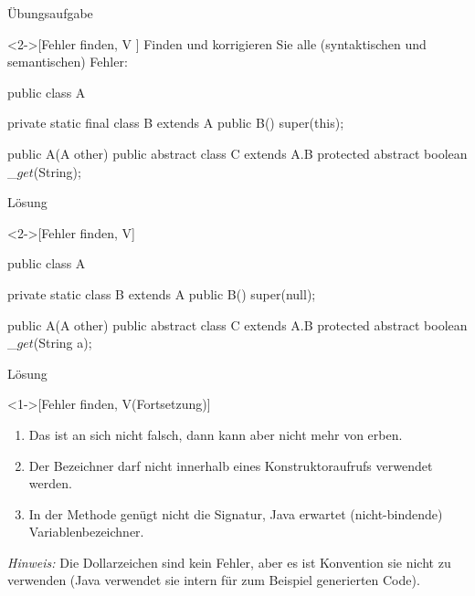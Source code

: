 \begin{frame}[c,fragile]{Übungsaufgabe}
    \begin{exercise}<2->[Fehler finden, V ]
        \pause{}Finden und korrigieren Sie alle (syntaktischen und semantischen) Fehler:\pause{}
{\footnotesize
        \begin{plainvoid}
public class A {
    private static final class B extends A {
        public B() {
            super(this);
        }
    }

    public A(A other){}
    public abstract class C extends A.B {
        protected abstract boolean _$get$(String);
    }
}
        \end{plainvoid}
}
    \end{exercise}
\end{frame}

\begin{frame}[c,fragile]{Lösung}
    \begin{solve}<2->[Fehler finden, V]
        \pause{}\footnotesize\begin{plainjava}[morekeywords={[3]{A,B,C}}]
public class A {
    private static class B extends A {
        public B() {
            super(null);
        }
    }

    public A(A other){}
    public abstract class C extends A.B {
        protected abstract boolean _$get$(String a);
    }
}
        \end{plainjava}
    \end{solve}
\end{frame}

\begin{frame}[c]{Lösung}
    \addtocounter{solve}{-1}
    \begin{solve}<1->[Fehler finden, V\hfill{}(Fortsetzung)]
        \begin{enumerate}
            \item Das  ist an sich nicht falsch, dann kann aber  nicht mehr von  erben.
            \item Der Bezeichner  darf nicht innerhalb eines Konstruktoraufrufs verwendet werden.
            \item In der Methode  genügt nicht die Signatur,\pause{} Java erwartet (nicht-bindende) Variablenbezeichner.
        \end{enumerate}
        \pause{}\textit{Hinweis:}\pause{} Die Dollarzeichen sind kein Fehler,\pause{} aber es ist Konvention sie nicht zu verwenden (Java verwendet sie intern für zum Beispiel generierten Code).
    \end{solve}
\end{frame}

